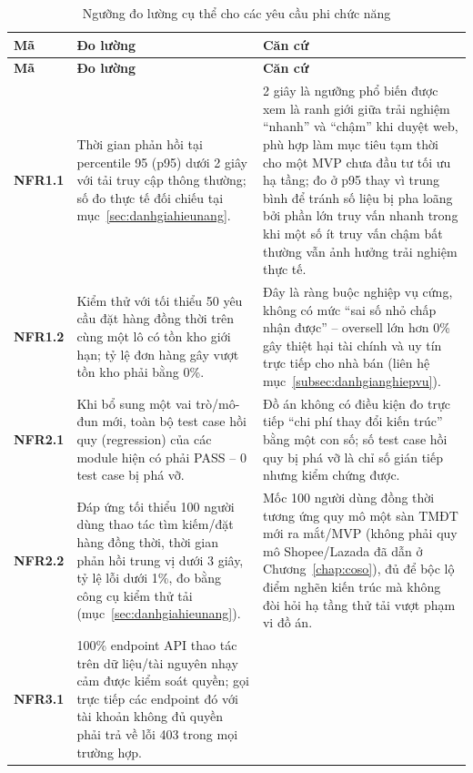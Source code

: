 \begingroup
\small
\renewcommand{\arraystretch}{1.3}
\setlength{\tabcolsep}{5pt}
\begin{longtable}{L{1.5cm} L{6.0cm} L{5.9cm}}
\caption{Ngưỡng đo lường cụ thể cho các yêu cầu phi chức năng}
\label{tab:nguongNFR} \\
\toprule
{}
\textbf{Mã} & \textbf{Đo lường} & \textbf{Căn cứ} \\
\midrule
\endfirsthead
\toprule
{}
\textbf{Mã} & \textbf{Đo lường} & \textbf{Căn cứ} \\
\midrule
\endhead
\bottomrule
\endfoot
\textbf{NFR1.1} &
Thời gian phản hồi tại percentile 95 (p95) dưới 2 giây với tải truy cập thông thường; số đo thực tế đối chiếu tại mục~\ref{sec:danhgiahieunang}. &
2 giây là ngưỡng phổ biến được xem là ranh giới giữa trải nghiệm ``nhanh'' và ``chậm'' khi duyệt web, phù hợp làm mục tiêu tạm thời cho một MVP chưa đầu tư tối ưu hạ tầng; đo ở p95 thay vì trung bình để tránh số liệu bị pha loãng bởi phần lớn truy vấn nhanh trong khi một số ít truy vấn chậm bất thường vẫn ảnh hưởng trải nghiệm thực tế. \\
\textbf{NFR1.2} &
Kiểm thử với tối thiểu 50 yêu cầu đặt hàng đồng thời trên cùng một lô có tồn kho giới hạn; tỷ lệ đơn hàng gây vượt tồn kho phải bằng 0\%. &
Đây là ràng buộc nghiệp vụ cứng, không có mức ``sai số nhỏ chấp nhận được'' -- oversell lớn hơn 0\% gây thiệt hại tài chính và uy tín trực tiếp cho nhà bán (liên hệ mục~\ref{subsec:danhgianghiepvu}). \\
\textbf{NFR2.1} &
Khi bổ sung một vai trò/mô-đun mới, toàn bộ test case hồi quy (regression) của các module hiện có phải PASS -- 0 test case bị phá vỡ. &
Đồ án không có điều kiện đo trực tiếp ``chi phí thay đổi kiến trúc'' bằng một con số; số test case hồi quy bị phá vỡ là chỉ số gián tiếp nhưng kiểm chứng được. \\
\textbf{NFR2.2} &
Đáp ứng tối thiểu 100 người dùng thao tác tìm kiếm/đặt hàng đồng thời, thời gian phản hồi trung vị dưới 3 giây, tỷ lệ lỗi dưới 1\%, đo bằng công cụ kiểm thử tải (mục~\ref{sec:danhgiahieunang}). &
Mốc 100 người dùng đồng thời tương ứng quy mô một sàn TMĐT mới ra mắt/MVP (không phải quy mô Shopee/Lazada đã dẫn ở Chương~\ref{chap:coso}), đủ để bộc lộ điểm nghẽn kiến trúc mà không đòi hỏi hạ tầng thử tải vượt phạm vi đồ án. \\
\textbf{NFR3.1} &
100\% endpoint API thao tác trên dữ liệu/tài nguyên nhạy cảm được kiểm soát quyền; gọi trực tiếp các endpoint đó với tài khoản không đủ quyền phải trả về lỗi 403 trong mọi trường hợp. &

\end{longtable}

